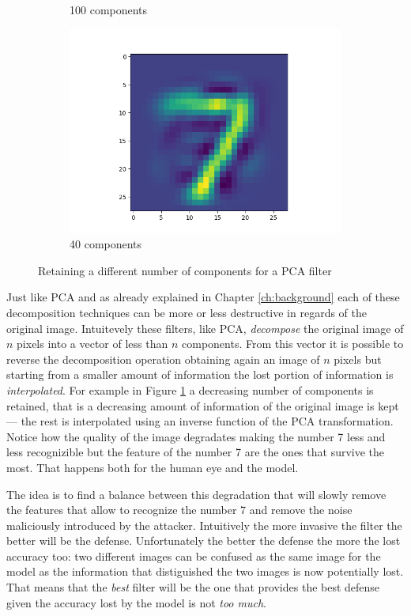 \begin{figure}
\begin{subfigure}{0.3\linewidth}
    \caption{100 components}
  \end{subfigure}
  \begin{subfigure}{0.3\linewidth}
    \includegraphics[width=\linewidth]{Images/filtered-input-pca-40-components.png}
    \caption{40 components}
  \end{subfigure}
  \caption{Retaining a different number of components for a PCA filter}
  \label{fig:various-pca-reductions}
\end{figure}

Just like PCA and as already explained in Chapter \ref{ch:background}
each of these decomposition techniques can be more or less destructive
in regards of the original image. Intuitevely these filters, like PCA,
\emph{decompose} the original image of $n$ pixels into a vector of less
than $n$ components. From this vector it is possible to reverse the
decomposition operation obtaining again an image of $n$ pixels but
starting from a smaller amount of information the lost portion of
information is \emph{interpolated}. For example in Figure
\ref{fig:various-pca-reductions} a decreasing number of components is
retained, that is a decreasing amount of information of the original
image is kept --- the rest is interpolated using an inverse function of
the PCA transformation. Notice how the quality of the image degradates
making the number 7 less and less recognizible but the feature of the
number 7 are the ones that survive the most. That happens both for the
human eye and the model.

The idea is to find a balance between this degradation that will slowly
remove the features that allow to recognize the number 7 and remove the
noise maliciously introduced by the attacker. Intuitively the more
invasive the filter the better will be the defense. Unfortunately the
better the defense the more the lost accuracy too: two different images
can be confused as the same image for the model as the information that
distiguished the two images is now potentially lost. That means that
the \emph{best} filter will be the one that provides the best defense
given the accuracy lost by the model is not \emph{too much}.

